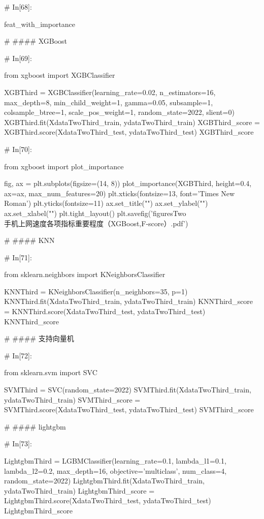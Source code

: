 \documentclass{MathorCupmodeling}
\begin{document}
\begin{python}
	# In[68]:
	
	
	feat_with_importance
	
	# #### XGBoost
	
	# In[69]:
	
	
	from xgboost import XGBClassifier
	
	XGBThird = XGBClassifier(learning_rate=0.02,
							 n_estimators=16,
							 max_depth=8,
							 min_child_weight=1,
							 gamma=0.05,
							 subsample=1,
							 colsample_btree=1,
							 scale_pos_weight=1,
							 random_state=2022,
							 slient=0)
	XGBThird.fit(XdataTwoThird_train, ydataTwoThird_train)
	XGBThird_score = XGBThird.score(XdataTwoThird_test, ydataTwoThird_test)
	XGBThird_score
	
	# In[70]:
	
	
	from xgboost import plot_importance
	
	fig, ax = plt.subplots(figsize=(14, 8))
	plot_importance(XGBThird, height=0.4, ax=ax, max_num_features=20)
	plt.xticks(fontsize=13, font='Times New Roman')
	plt.yticks(fontsize=11)
	ax.set_title("")
	ax.set_ylabel("")
	ax.set_xlabel("")
	plt.tight_layout()
	plt.savefig('figuresTwo\\[附件2]手机上网速度各项指标重要程度（XGBoost,F-score）.pdf')
	
	# #### KNN
	
	# In[71]:
	
	
	from sklearn.neighbors import KNeighborsClassifier
	
	KNNThird = KNeighborsClassifier(n_neighbors=35, p=1)
	KNNThird.fit(XdataTwoThird_train, ydataTwoThird_train)
	KNNThird_score = KNNThird.score(XdataTwoThird_test, ydataTwoThird_test)
	KNNThird_score
	
	# #### 支持向量机
	
	# In[72]:
	
	
	from sklearn.svm import SVC
	
	SVMThird = SVC(random_state=2022)
	SVMThird.fit(XdataTwoThird_train, ydataTwoThird_train)
	SVMThird_score = SVMThird.score(XdataTwoThird_test, ydataTwoThird_test)
	SVMThird_score
	
	# #### lightgbm
	
	# In[73]:
	
	
	LightgbmThird = LGBMClassifier(learning_rate=0.1,
								   lambda_l1=0.1,
								   lambda_l2=0.2,
								   max_depth=16,
								   objective='multiclass',
								   num_class=4,
								   random_state=2022)
	LightgbmThird.fit(XdataTwoThird_train, ydataTwoThird_train)
	LightgbmThird_score = LightgbmThird.score(XdataTwoThird_test, ydataTwoThird_test)
	LightgbmThird_score
	

\end{python}
\end{document}
